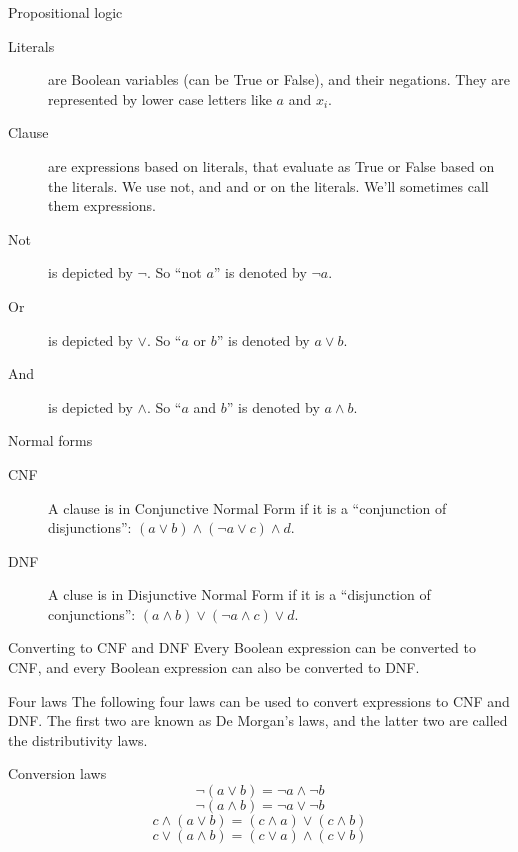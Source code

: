 \begin{frame}{Propositional logic}
  \begin{description}
    \item[Literals] are Boolean variables (can be True or False), and their negations. They are represented by lower case letters like $a$ and $x_i$.
    \vspace{0.3cm}
    \item[Clause] are expressions based on literals, that evaluate as True or False based on the literals. We use not, and and or on the literals. We'll sometimes call them expressions.
    \vspace{0.3cm}
    \item[Not] is depicted by $\neg$. So ``not $a$'' is denoted by $\neg a$.
    \vspace{0.3cm}
    \item[Or] is depicted by $\vee$. So ``$a$ or $b$'' is denoted by $a \vee b$.
    \vspace{0.3cm}
    \item[And] is depicted by $\wedge$. So ``$a$ and $b$'' is denoted by $a \wedge b$.
  \end{description}
\end{frame}

\begin{frame}{Normal forms}
  \begin{description}
    \item[CNF] A clause is in Conjunctive Normal Form if it is a ``conjunction of disjunctions'': $(a \vee b) \wedge (\neg a \vee c) \wedge d$.
    \vspace{0.5cm}
    \item[DNF] A cluse is in Disjunctive Normal Form if it is a ``disjunction of conjunctions'': $(a \wedge b) \vee (\neg a \wedge c) \vee d$.
  \end{description}
  \vspace{0.5cm}
  {\begin{block}{Converting to CNF and DNF}
    Every Boolean expression can be converted to CNF, and every Boolean expression can also be converted to DNF.
  \end{block}}
\end{frame}

\begin{frame}{Four laws}
  The following four laws can be used to convert expressions to CNF and DNF.
  The first two are known as De Morgan's laws, and the latter two are called the distributivity laws.
  \vspace{0.5cm}
  {\begin{block}{Conversion laws}
    \[ \neg ( a \vee b) = \neg a \wedge \neg b \]
    \[ \neg ( a \wedge b) = \neg a \vee \neg b \]
    \[ c \wedge ( a \vee b) = (c \wedge a) \vee (c \wedge b) \]
    \[ c \vee ( a \wedge b) = (c \vee a) \wedge (c \vee b) \]
  \end{block}}
\end{frame}


